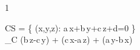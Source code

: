 \documentclass[\mainfilename]{subfiles}
\begin{document}
\group{}

\begin{questionBox}1{}
    
    \begin{BM}
        C\subset S
        = \left\{
            (x,y,z):
            a\,x+b\,y+c\,z+d=0
        \right\}
        \\[2ex]
        \int_C {
            (b\,z-c\,y)
            + (c\,x-a\,z)
            + (a\,y-b\,x)
        }
    \end{BM}
    
\end{questionBox}
\end{document}
